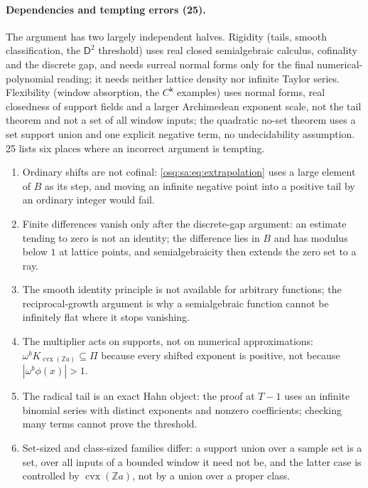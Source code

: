 \documentclass[11pt,letterpaper]{article}
\numberwithin{equation}{section}
\theoremstyle{definition}
\theoremstyle{remark}
\theoremstyle{plain}
\newcommand{\Z}{\mathbb Z}
\begin{document}
\paragraph{Dependencies and tempting errors (25).} The argument has two largely independent halves. Rigidity (tails, smooth classification, the
$\mathsf D^2$ threshold) uses real closed semialgebraic calculus, cofinality and the discrete gap, and needs surreal normal forms only for the final
numerical-polynomial reading; it needs neither lattice density nor infinite Taylor series. Flexibility (window absorption, the $C^{\mathsf k}$ examples)
uses normal forms, real closedness of support fields and a larger Archimedean exponent scale, not the tail theorem and not a set of all window inputs; the
quadratic no-set theorem uses a set support union and one explicit negative term, no undecidability assumption. 25 lists six places where an incorrect
argument is tempting.
\begin{enumerate}
\item Ordinary shifts are not cofinal: \eqref{osq:sa:eq:extrapolation} uses a large element of $B$ as its step, and moving an infinite negative point into a
positive tail by an ordinary integer would fail.
\item Finite differences vanish only after the discrete-gap argument: an estimate tending to zero is not an identity; the difference lies in $B$ and has
modulus below $1$ at lattice points, and semialgebraicity then extends the zero set to a ray.
\item The smooth identity principle is not available for arbitrary functions; the reciprocal-growth argument is why a semialgebraic function cannot be
infinitely flat where it stops vanishing.
\item The multiplier acts on supports, not on numerical approximations: $\omega^bK_{\operatorname{cvx}(\Z a)}\subseteq\Pi$ because every shifted exponent is
positive, not because $|\omega^b\phi(x)|>1$.
\item The radical tail is an exact Hahn object: the proof at $T-1$ uses an infinite binomial series with distinct exponents and nonzero coefficients;
checking many terms cannot prove the threshold.
\item Set-sized and class-sized families differ: a support union over a sample set is a set, over all inputs of a bounded window it need not be, and the
latter case is controlled by $\operatorname{cvx}(\Z a)$, not by a union over a proper class.
\end{enumerate}
\end{document}
